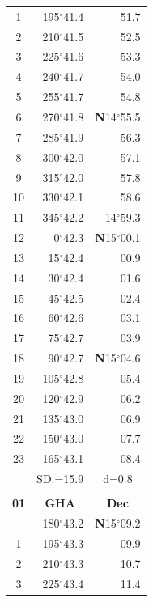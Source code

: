 \documentclass[10pt, a4paper]{report}
\begin{document}
\begin{scriptsize}
\begin{tabular*}{0.2\textwidth}[t]{@{\extracolsep{\fill}}|c|rr|}
1 & 195$^\circ$41.4 & 51.7\\
2 & 210$^\circ$41.5 & 52.5\\
3 & 225$^\circ$41.6 & \raisebox{0.24ex}{\boldmath$\cdot$~\boldmath$\cdot$~~}53.3\\
4 & 240$^\circ$41.7 & 54.0\\
5 & 255$^\circ$41.7 & 54.8\\[2Pt]
6 & 270$^\circ$41.8 & \textbf{N}14$^\circ$55.5\\
7 & 285$^\circ$41.9 & 56.3\\
8 & 300$^\circ$42.0 & 57.1\\
9 & 315$^\circ$42.0 & \raisebox{0.24ex}{\boldmath$\cdot$~\boldmath$\cdot$~~}57.8\\
10 & 330$^\circ$42.1 & 58.6\\
11 & 345$^\circ$42.2 & 14$^\circ$59.3\\[2Pt]
12 & 0$^\circ$42.3 & \textbf{N}15$^\circ$00.1\\
13 & 15$^\circ$42.4 & 00.9\\
14 & 30$^\circ$42.4 & 01.6\\
15 & 45$^\circ$42.5 & \raisebox{0.24ex}{\boldmath$\cdot$~\boldmath$\cdot$~~}02.4\\
16 & 60$^\circ$42.6 & 03.1\\
17 & 75$^\circ$42.7 & 03.9\\[2Pt]
18 & 90$^\circ$42.7 & \textbf{N}15$^\circ$04.6\\
19 & 105$^\circ$42.8 & 05.4\\
20 & 120$^\circ$42.9 & 06.2\\
21 & 135$^\circ$43.0 & \raisebox{0.24ex}{\boldmath$\cdot$~\boldmath$\cdot$~~}06.9\\
22 & 150$^\circ$43.0 & 07.7\\
23 & 165$^\circ$43.1 & 08.4\\
\hline
\rule{0pt}{2.4ex} & \multicolumn{1}{c}{SD.=15.9} & \multicolumn{1}{c|}{d=0.8}\\
\hline
\multicolumn{1}{c}{}\\[-0.5ex]\hline
\multicolumn{1}{|c|}{\rule{0pt}{2.6ex}\textbf{01}} & \multicolumn{1}{c}{\textbf{GHA}} & \multicolumn{1}{c|}{\textbf{Dec}}\\
\hline\rule{0pt}{2.6ex}\noindent
0 & 180$^\circ$43.2 & \textbf{N}15$^\circ$09.2\\
1 & 195$^\circ$43.3 & 09.9\\
2 & 210$^\circ$43.3 & 10.7\\
3 & 225$^\circ$43.4 & \raisebox{0.24ex}{\boldmath$\cdot$~\boldmath$\cdot$~~}11.4\\

\end{tabular*}
\end{scriptsize}
\end{document}
